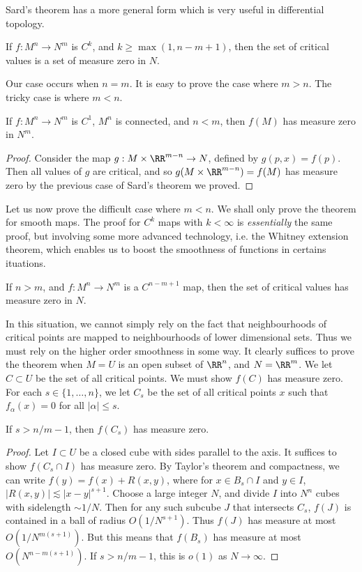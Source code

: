 Sard's theorem has a more general form which is very useful in differential topology.

\begin{theorem}[Sard]
    If $f: M^n \to N^m$ is $C^k$, and $k \geq \max(1,n-m+1)$, then the set of critical values is a set of measure zero in $N$.
\end{theorem}

Our case occurs when $n = m$. It is easy to prove the case where $m > n$. The tricky case is where $m < n$.

\begin{theorem}
    If $f:M^n \to N^m$ is $C^1$, $M^n$ is connected, and $n < m$, then $f(M)$ has measure zero in $N^m$.
\end{theorem}
\begin{proof}
    Consider the map $g: M \times \RR^{m-n} \to N$, defined by $g(p,x) = f(p)$. Then all values of $g$ are critical, and so $g(M \times \RR^{m-n}) = f(M)$ has measure zero by the previous case of Sard's theorem we proved.
\end{proof}

Let us now prove the difficult case where $m < n$. We shall only prove the theorem for smooth maps. The proof for $C^k$ maps with $k < \infty$ is \emph{essentially} the same proof, but involving some more advanced technology, i.e. the Whitney extension theorem, which enables us to boost the smoothness of functions in certains ituations.

\begin{theorem}
    If $n > m$, and $f: M^n \to N^m$ is a $C^{n-m+1}$ map, then the set of critical values has measure zero in $N$.
\end{theorem}

In this situation, we cannot simply rely on the fact that neighbourhoods of critical points are mapped to neighbourhoods of lower dimensional sets. Thus we must rely on the higher order smoothness in some way. It clearly suffices to prove the theorem when $M = U$ is an open subset of $\RR^n$, and $N = \RR^m$. We let $C \subset U$ be the set of all critical points. We must show $f(C)$ has measure zero. For each $s \in \{ 1, \dots, n \}$, we let $C_s$ be the set of all critical points $x$ such that $f_\alpha(x) = 0$ for all $|\alpha| \leq s$.

\begin{lemma}
    If $s > n/m - 1$, then $f(C_s)$ has measure zero.
\end{lemma}
\begin{proof}
    Let $I \subset U$ be a closed cube with sides parallel to the axis. It suffices to show $f(C_s \cap I)$ has measure zero. By Taylor's theorem and compactness, we can write $f(y) = f(x) + R(x,y)$, where for $x \in B_s \cap I$ and $y \in I$, $|R(x,y)| \lesssim |x - y|^{s+1}$. Choose a large integer $N$, and divide $I$ into $N^n$ cubes with sidelength $\sim 1/N$. Then for any such subcube $J$ that intersects $C_s$, $f(J)$ is contained in a ball of radius $O(1/N^{s+1})$. Thus $f(J)$ has measure at most $O(1/N^{m(s+1)})$. But this means that $f(B_s)$ has measure at most $O(N^{n-m(s+1)})$. If $s > n/m-1$, this is $o(1)$ as $N \to \infty$.
\end{proof}

